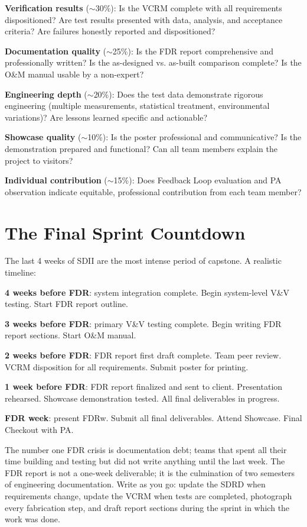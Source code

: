 \textbf{Verification results} ($\sim$30\%): Is the VCRM complete with all requirements dispositioned? Are test results presented with data, analysis, and acceptance criteria? Are failures honestly reported and dispositioned?

\textbf{Documentation quality} ($\sim$25\%): Is the FDR report comprehensive and professionally written? Is the as-designed vs. as-built comparison complete? Is the O\&M manual usable by a non-expert?

\textbf{Engineering depth} ($\sim$20\%): Does the test data demonstrate rigorous engineering (multiple measurements, statistical treatment, environmental variations)? Are lessons learned specific and actionable?

\textbf{Showcase quality} ($\sim$10\%): Is the poster professional and communicative? Is the demonstration prepared and functional? Can all team members explain the project to visitors?

\textbf{Individual contribution} ($\sim$15\%): Does Feedback Loop evaluation and PA observation indicate equitable, professional contribution from each team member?

\section{The Final Sprint Countdown}
The last 4 weeks of SDII are the most intense period of capstone. A realistic timeline:

\textbf{4 weeks before FDR}: system integration complete. Begin system-level V\&V testing. Start FDR report outline.

\textbf{3 weeks before FDR}: primary V\&V testing complete. Begin writing FDR report sections. Start O\&M manual.

\textbf{2 weeks before FDR}: FDR report first draft complete. Team peer review. VCRM disposition for all requirements. Submit poster for printing.

\textbf{1 week before FDR}: FDR report finalized and sent to client. Presentation rehearsed. Showcase demonstration tested. All final deliverables in progress.

\textbf{FDR week}: present FDRw. Submit all final deliverables. Attend Showcase. Final Checkout with PA.

\begin{warningbox}
The number one FDR crisis is documentation debt; teams that spent all their time building and testing but did not write anything until the last week. The FDR report is not a one-week deliverable; it is the culmination of two semesters of engineering documentation. Write as you go: update the SDRD when requirements change, update the VCRM when tests are completed, photograph every fabrication step, and draft report sections during the sprint in which the work was done.
\end{warningbox}



